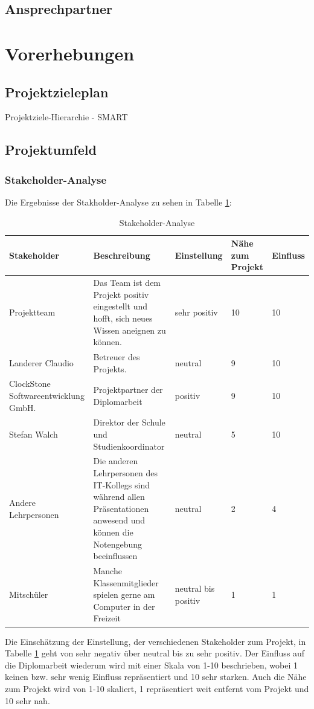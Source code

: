 \subsection{Ansprechpartner}

\section{Vorerhebungen}
\subsection{Projektzieleplan}
\def \currentAuthor {Michael Leitner} %
Projektziele-Hierarchie - SMART
\subsection{Projektumfeld}
\def \currentAuthor {Lukas Vogel} %
\subsubsection{Stakeholder-Analyse}
Die Ergebnisse der Stakholder-Analyse zu sehen in Tabelle \ref{Stakeholder-Analyse}:
\begin{table}[H]
		
	\renewcommand{\arraystretch}{1.5}
		\begin{tabular}{|p{3cm}|p{6cm}|p{3cm}|p{1.5cm}|p{1.5cm}|}
			\hline
			\textbf{Stakeholder} & \textbf{Beschreibung} & \textbf{Einstellung} & \textbf{Nähe zum Projekt} & \textbf{Einfluss} \\
			\hline
			Projektteam & Das Team ist dem Projekt positiv eingestellt und hofft, sich neues Wissen aneignen zu können. & sehr positiv & 10 & 10\\
			\hline
			Landerer Claudio & Betreuer des Projekts. & neutral & 9 &10\\
			\hline
			ClockStone Softwareentwicklung GmbH.& Projektpartner der Diplomarbeit & positiv & 9 & 10\\
			\hline
			Stefan Walch & Direktor der Schule und Studienkoordinator & neutral& 5 & 10\\
			\hline
			Andere Lehrpersonen & Die anderen Lehrpersonen des IT-Kollegs sind während allen Präsentationen anwesend und können die Notengebung beeinflussen & neutral& 2 & 4\\
			\hline
			Mitschüler & Manche Klassenmitglieder spielen gerne am Computer in der Freizeit	& neutral bis positiv & 1 & 1\\
			\hline
		\end{tabular}
\caption{Stakeholder-Analyse}
\label{Stakeholder-Analyse}
	\end{table}
Die Einschätzung der Einstellung, der verschiedenen Stakeholder zum Projekt, in Tabelle \ref{Stakeholder-Analyse} geht von sehr negativ über neutral bis zu sehr positiv. Der Einfluss auf die Diplomarbeit wiederum wird mit einer Skala von 1-10 beschrieben, wobei 1 keinen bzw. sehr wenig Einfluss repräsentiert und 10 sehr starken. Auch die Nähe zum Projekt wird von 1-10 skaliert, 1 repräsentiert weit entfernt vom Projekt und 10 sehr nah.
